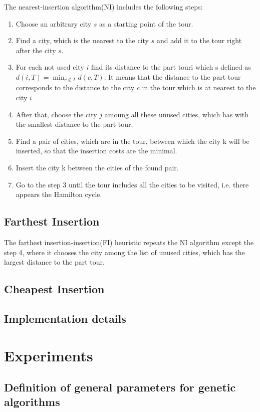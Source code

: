 \documentclass[a4paper, 12pt, headings=standardclasses]{scrartcl}
\begin{document}
The nearest-insertion algorithm(NI) includes the following steps:
\begin{enumerate}
	\item Choose an arbitrary city $s$ as a starting point of the tour.
	\item Find a city, which is the nearest to the city $s$ and add it to the tour right after the city $s$.
	\item For each not used city $i$ find its distance to the part touri which s defined as $d(i, T) = \min _{c \notin T}d(c, T)$. It means that the distance to the part tour corresponds to the distance to the city $c$ in the tour which is at nearest to the city $i$
	\item After that, choose the city $j$ amoung all these unused cities, which has with the smallest distance to the part tour.
	\item Find a pair of cities, which are in the tour, between which the city k will be inserted, so that
	the insertion costs are the minimal.
	\item Insert the city k between the cities of the found pair.
	\item Go to the step 3 until the tour includes all the cities to be visited, i.e. there appears the Hamilton cycle.
\end{enumerate}


\subsection{Farthest Insertion}
The farthest insertion-insertion(FI) heuristic repeats the NI algorithm except the step 4, where it chooses the city among the list of unused cities, which has the largest distance to the part tour. 

\subsection{Cheapest Insertion}
\subsection{Implementation details}



\section{Experiments}

\subsection{Definition of general parameters for genetic algorithms}
\end{document}
